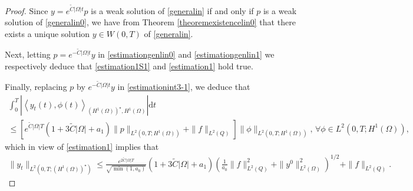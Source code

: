 \documentclass[reqno,twoside]{amsart}
\numberwithin{equation}{section}
\theoremstyle{definition}
\numberwithin{equation}{section}
\def \dis {\displaystyle}
\def \dt{\mathrm{d}t}
\begin{document}
\begin{proof}
Since $y=e^{\tilde{C}|\Omega|t}p$ is a weak solution of \eqref{generalin} if and only if $p$ is a weak solution of \eqref{generalin0}, we have from Theorem \ref{theoremexistencelin0} that there exists a unique solution $y \in W(0,T)$ of \eqref{generalin}.\par
Next,  letting $p=e^{-\tilde{C}|\Omega|t}y$  in \eqref{estimationgenlin0} and \eqref{estimationgenlin1} we  respectively deduce that \eqref{estimation1S1} and \eqref{estimation1} hold true.\par
Finally,  replacing $p$ by $e^{-\tilde{C}|\Omega|t}y$ in \eqref{estimationint3-1}, we deduce that 
$$
\begin{array}{llll}
	\dis \int_0^T |\left\langle y_t(t),\phi(t)\right\rangle_{(H^1(\Omega))^\star,H^1(\Omega)}| \dt\\
	\leq  \left[e^{\tilde{C}|\Omega|T}\left(1+3\tilde{C}|\Omega|+a_1\right)\|p\|_{L^2(0,T;H^1(\Omega))}+\|f\|_{L^2(Q)}\right]
	\|\phi\|_{L^2(0,T;H^1(\Omega))},\,\forall \phi\in L^2(0,T;H^1(\Omega)),
\end{array}
$$
which in view of  \eqref{estimation1} implies that 
$$
\begin{array}{llll}
	\dis \|y_t\|_{L^2(0,T;(H^1(\Omega))^\star)} \leq
	\frac{e^{2\tilde{C}|\Omega|T}}{\sqrt{\min(1,a_0)}}\left(1+3\tilde{C}|\Omega|+a_1\right)
	\left(\frac{1}{a_0}\|f\|^2_{L^2(Q)}+\|y^0\|^2_{L^2(\Omega)}\right)^{1/2}+\|f\|_{L^2(Q)}.
\end{array}
$$


\end{proof}
\end{document}

